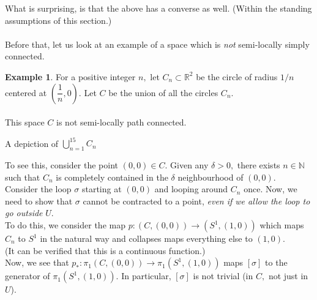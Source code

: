 \documentclass[12pt]{article}
\theoremstyle{definition}
\numberwithin{thm}{section}
\newtheorem{ex}{Example}
\begin{document}
What is surprising, is that the above has a converse as well. (Within the standing assumptions of this section.)\\~\\
%
Before that, let us look at an example of a space which is \emph{not} semi-locally simply connected.
\begin{ex}
	For a positive integer $n,$ let $C_n \subset \mathbb{R}^2$ be the circle of radius $1/n$ centered at $\left(\dfrac{1}{n}, 0\right).$ Let $C$ be the union of all the circles $C_n.$\\~\\
	This space $C$ is not semi-locally path connected.

	\begin{center}

		A depiction of $\displaystyle\bigcup_{n = 1}^{15}C_n$
	\end{center}

	To see this, consider the point $(0, 0) \in C.$ Given any $\delta > 0,$ there exists $n \in \mathbb{N}$ such that $C_n$ is completely contained in the $\delta$ neighbourhood of $(0, 0).$\\
	Consider the loop $\sigma$ starting at $(0, 0)$ and looping around $C_n$ once. Now, we need to show that $\sigma$ cannot be contracted to a point, \emph{even if we allow the loop to go outside} $U.$\\
	To do this, we consider the map $p:(C, (0, 0)) \to (S^1, (1, 0))$ which maps $C_n$ to $S^1$ in the natural way and collapses maps everything else to $(1, 0).$\\
	(It can be verified that this is a continuous function.)\\
	Now, we see that $p_*:\pi_1(C, (0, 0)) \to \pi_1(S^1, (1, 0))$ maps $[\sigma]$ to the generator of $\pi_1(S^1, (1, 0)).$ In particular, $[\sigma]$ is not trivial (in $C,$ not just in $U$).
\end{ex}
\end{document}
